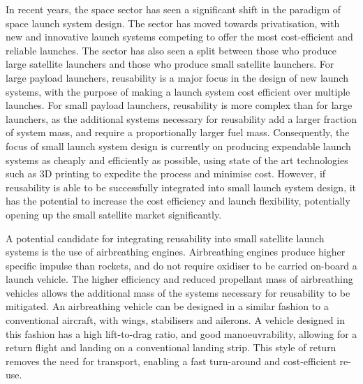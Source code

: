   	
  	In recent years, the space sector has seen a significant shift in the paradigm of space launch system design. 
  	The sector has moved towards privatisation, with new and innovative launch systems competing to offer the most cost-efficient and reliable launches. 
  	The sector has also seen a split between those who produce large satellite launchers and those who produce small satellite launchers.
  	For large payload launchers, reusability is a major focus in the design of new launch systems, with the purpose of making a launch system cost efficient over multiple launches\cite{Faa2018}. 
  	For small payload launchers, reusability is more complex than for large launchers, as the additional systems necessary for reusability add a larger fraction of system mass, and require a proportionally larger fuel mass. 
  	Consequently, the focus of small launch system design is currently on producing expendable launch systems as cheaply and efficiently as possible, using state of the art technologies such as 3D printing to expedite the process and minimise cost\cite{Niederstrasser2015}.
  	However, if reusability is able to be successfully integrated into small launch system design, it has the potential to increase the cost efficiency and launch flexibility, potentially opening up the small satellite market significantly. 
  	
  	
  	
  	A potential candidate for integrating reusability into small satellite launch systems is the use of airbreathing engines\cite{Smart2009a,Ketsdever2010}.
Airbreathing engines produce higher specific impulse than rockets, and do not require oxidiser to be carried on-board a launch vehicle\cite{Smart2010}.  	 
  	The higher efficiency and reduced propellant mass of airbreathing vehicles allows the additional mass of the systems necessary for reusability to be mitigated\cite{Curran2003}. An airbreathing vehicle can be designed in a similar fashion to a conventional aircraft, with wings, stabilisers and ailerons\cite{Shaughnessy1990,Preller2017b}. A vehicle designed in this fashion has a high lift-to-drag ratio, and good manoeuvrability, allowing for a return flight and landing on a conventional landing strip\cite{Preller2017b}. This style of return removes the need for transport, enabling a fast turn-around and cost-efficient re-use. 
  	
